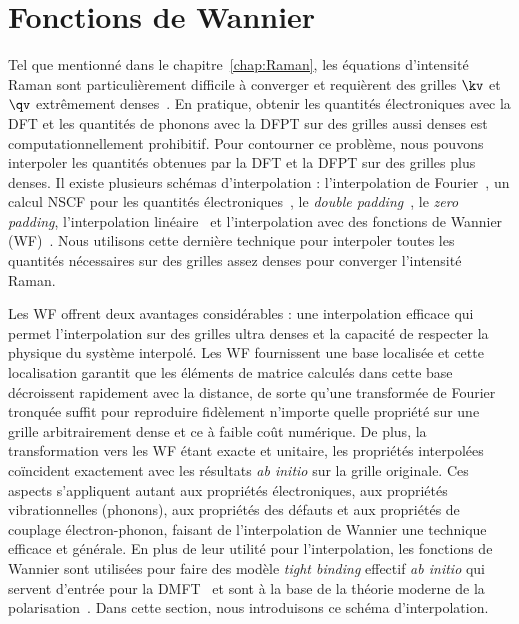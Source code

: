 \section{Fonctions de Wannier}
Tel que mentionné dans le chapitre~\ref{chap:Raman}, les équations d'intensité Raman sont particulièrement difficile à converger et requièrent des grilles $\kv$ et $\qv$ extrêmement denses~\cite{lazzeriFirstPrinciplesCalculationVibrational2003,gilletFirstprinciplesStudyExcitonic2013a,bagheriHighthroughputComputationRaman2023}. En pratique, obtenir les quantités électroniques avec la DFT et les quantités de phonons avec la DFPT sur des grilles aussi denses est computationnellement prohibitif. Pour contourner ce problème, nous pouvons interpoler les quantités obtenues par la DFT et la DFPT sur des grilles plus denses. Il existe plusieurs schémas d'interpolation : l'interpolation de Fourier~\cite{madsenBoltzTraP2ProgramInterpolating2018}, un calcul NSCF pour les quantités électroniques~\cite{bruninPhononlimitedElectronMobility2020}, le \textit{double padding}~\cite{bruninPhononlimitedElectronMobility2020}, le \textit{zero padding}, l'interpolation linéaire~\cite{liElectricalTransportLimited2015} et l'interpolation avec des fonctions de Wannier (WF)~\cite{ponceEPWElectronphononCoupling2016}. Nous utilisons cette dernière technique pour interpoler toutes les quantités nécessaires sur des grilles assez denses pour converger l'intensité Raman. 

Les WF offrent deux avantages considérables : une interpolation efficace qui permet l'interpolation sur des grilles ultra denses et la capacité de respecter la physique du système interpolé. Les WF fournissent une base localisée et cette localisation garantit que les éléments de matrice calculés dans cette base décroissent rapidement avec la distance, de sorte qu'une transformée de Fourier tronquée suffit pour reproduire fidèlement n'importe quelle propriété sur une grille arbitrairement dense et ce à faible coût numérique. De plus, la transformation vers les WF étant exacte et unitaire, les propriétés interpolées coïncident exactement avec les résultats \textit{ab initio} sur la grille originale. Ces aspects s'appliquent autant aux propriétés électroniques, aux propriétés vibrationnelles (phonons), aux propriétés des défauts et aux propriétés de couplage électron-phonon, faisant de l'interpolation de Wannier une technique efficace et générale. En plus de leur utilité pour l'interpolation, les fonctions de Wannier sont utilisées pour faire des modèle \textit{tight binding} effectif \textit{ab initio} qui servent d'entrée pour la DMFT~\cite{lechermannDynamicalMeanfieldTheory2006} et sont à la base de la théorie moderne de la polarisation~\cite{king-smithTheoryPolarizationCrystalline1993,restaMacroscopicPolarizationCrystalline1994}. Dans cette section, nous introduisons ce schéma d'interpolation.
